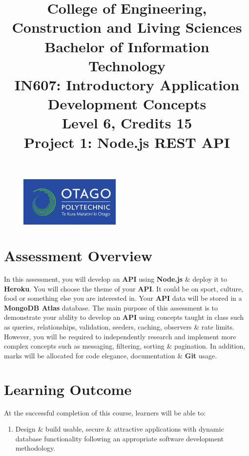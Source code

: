 \documentclass{article}
\author{}
\begin{document}
\begin{figure}
    \centering
    \includegraphics[width=50mm]{../img/logo.png}
\end{figure}

\title{College of Engineering, Construction and Living Sciences\\Bachelor of Information Technology\\IN607: Introductory Application Development Concepts\\Level 6, Credits 15\\\textbf{Project 1: Node.js REST API}}
\date{}
\maketitle

\section*{Assessment Overview}
In this assessment, you will develop an \textbf{API} using \textbf{Node.js} \& deploy it to \textbf{Heroku}. You will choose the theme of your \textbf{API}. It could be on sport, culture, food or something else you are interested in. Your \textbf{API} data will be stored in a \textbf{MongoDB Atlas} database. The main purpose of this assessment is to demonstrate your ability to develop an \textbf{API} using concepts taught in class such as queries, relationships, validation, seeders, caching, observers \& rate limits. However, you will be required to independently research and implement more complex concepts such as messaging, filtering, sorting \& pagination. In addition, marks will be allocated for code elegance, documentation \& \textbf{Git} usage. 

\section*{Learning Outcome}
At the successful completion of this course, learners will be able to:
\begin{enumerate}
    \item Design \& build usable, secure \& attractive applications with dynamic database functionality following an appropriate software development methodology.
\end{enumerate}
\end{document}
